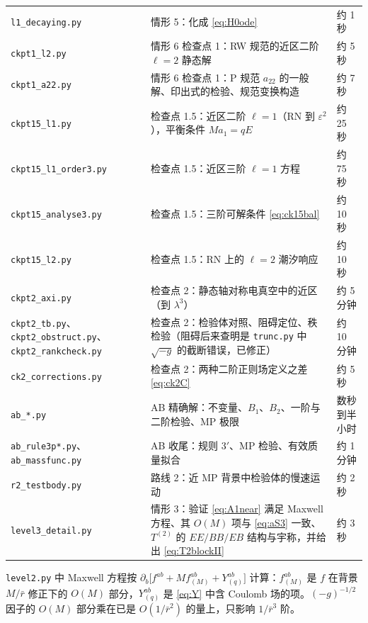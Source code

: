 \documentclass[11pt,a4paper]{ctexart}
\numberwithin{equation}{section}
\begin{document}
\begin{center}
\begin{tabular}{p{}p{}l}
\texttt{l1\_decaying.py} & 情形 5：化成 \eqref{eq:H0ode} & 约 1 秒\\
\texttt{ckpt1\_l2.py} & 情形 6 检查点 1：RW 规范的近区二阶 $\ell=2$ 静态解 & 约 5 秒\\
\texttt{ckpt1\_a22.py} & 情形 6 检查点 1：P 规范 $a_{22}$ 的一般解、印出式的检验、规范变换构造 & 约 7 秒\\
\texttt{ckpt15\_l1.py} & 检查点 1.5：近区二阶 $\ell=1$（RN 到 $\varepsilon^2$），平衡条件 $Ma_1=qE$ & 约 25 秒\\
\texttt{ckpt15\_l1\_order3.py} & 检查点 1.5：近区三阶 $\ell=1$ 方程 & 约 75 秒\\
\texttt{ckpt15\_analyse3.py} & 检查点 1.5：三阶可解条件 \eqref{eq:ck15bal} & 约 10 秒\\
\texttt{ckpt15\_l2.py} & 检查点 1.5：RN 上的 $\ell=2$ 潮汐响应 & 约 10 秒\\
\texttt{ckpt2\_axi.py} & 检查点 2：静态轴对称电真空中的近区（到 $\lambda^3$） & 约 5 分钟\\
\texttt{ckpt2\_tb.py}、\texttt{ckpt2\_obstruct.py}、\texttt{ckpt2\_rankcheck.py} & 检查点 2：检验体对照、阻碍定位、秩检验（阻碍后来查明是 \texttt{trunc.py} 中 $\sqrt{-g}$ 的截断错误，已修正） & 约 10 分钟\\
\texttt{ck2\_corrections.py} & 检查点 2：两种二阶正则场定义之差 \eqref{eq:ck2C} & 约 5 秒\\
\texttt{ab\_*.py} & AB 精确解：不变量、$B_1$、$B_2$、一阶与二阶检验、MP 极限 & 数秒到半小时\\
\texttt{ab\_rule3p*.py}、\texttt{ab\_massfunc.py} & AB 收尾：规则 3$'$、MP 检验、有效质量拟合 & 约 1 分钟\\
\texttt{r2\_testbody.py} & 路线 2：近 MP 背景中检验体的慢速运动 & 约 2 秒\\
\texttt{level3\_detail.py} & 情形 3：验证 \eqref{eq:A1near} 满足 Maxwell 方程、其 $O(M)$ 项与 \eqref{eq:aS3} 一致、$T^{(2)}$ 的 $EE/BB/EB$ 结构与宇称，并给出 \eqref{eq:T2blockII} & 约 3 秒\\
\hline
\end{tabular}
\end{center}
\texttt{level2.py} 中 Maxwell 方程按 $\partial_b\big[f^{ab}+M f^{ab}_{(M)}+Y^{ab}_{(q)}\big]$ 计算：$f^{ab}_{(M)}$ 是 $f$ 在背景 $M/\bar r$ 修正下的 $O(M)$ 部分，$Y^{ab}_{(q)}$ 是 \eqref{eq:Y} 中含 Coulomb 场的项。$(-g)^{-1/2}$ 因子的 $O(M)$ 部分乘在已是 $O(1/\bar r^2)$ 的量上，只影响 $1/\bar r^3$ 阶。



\end{document}
